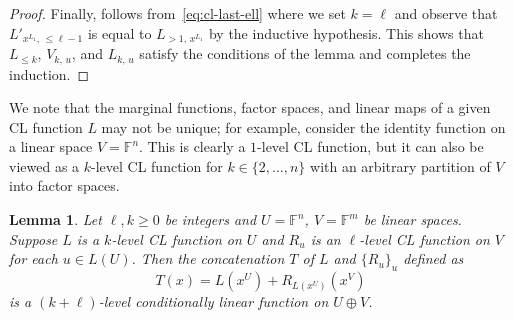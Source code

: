 \documentclass[11pt]{article}
\newtheorem{lemma}[theorem]{Lemma}
\theoremstyle{definition}
\newcommand{\F}{\ensuremath{\mathbb{F}}}
\begin{document}
\begin{proof}
  Finally,  follows from~\eqref{eq:cl-last-ell} where we
  set $k = \ell$ and observe that $L'_{x^{L_1},\, \le \ell-1}$ is equal to
  $L_{>1,\, x^{L_1}}$ by the inductive hypothesis.
  This shows that $L_{\le k}$, $V_{k,\, u}$, and $L_{k,\, u}$ satisfy the
  conditions of the lemma and completes the induction.
\end{proof}

We note that the marginal functions, factor spaces, and linear maps of a given
CL function $L$ may not be unique; for example, consider the identity function
on a linear space $V = \F^n$.
This is clearly a $1$-level CL function, but it can also be viewed as a
$k$-level CL function for $k \in \{2, \ldots, n\}$ with an arbitrary partition
of $V$ into factor spaces.

\begin{lemma}
  \label{lem:cl-concat}
  Let $\ell, k \ge 0$ be integers and $U = \F^n$, $V = \F^m$ be linear spaces.
  Suppose $L$ is a $k$-level CL function on $U$ and $R_u$ is an $\ell$-level CL
  function on $V$ for each $u \in L(U)$.
  Then the \emph{concatenation} $T$ of $L$ and $\{R_u\}_u$ defined as
  \begin{equation*}
    T (x) = L(x^U) + R_{L(x^U)} (x^V)
  \end{equation*}
  is a $(k+\ell)$-level conditionally linear function on $U\oplus V$.
\end{lemma}
\end{document}
